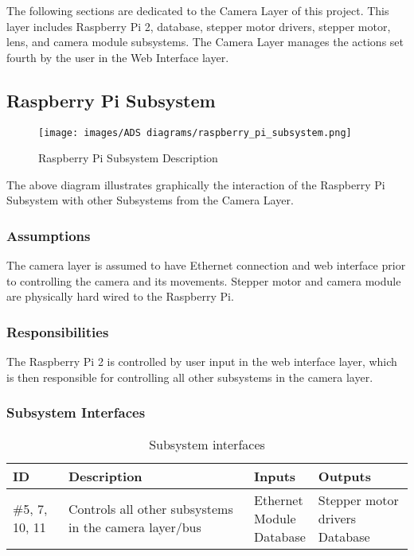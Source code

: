 The following sections are dedicated to the Camera Layer of this project. This layer includes Raspberry Pi 2, database, stepper motor drivers, stepper motor, lens, and camera module subsystems. The Camera Layer manages the actions set fourth by the user in the Web Interface layer.

\subsection{Raspberry Pi Subsystem}

\begin{figure}[h!]
	\centering
 	\texttt{[image: images/ADS diagrams/raspberry\_pi\_subsystem.png]}
 \caption{Raspberry Pi Subsystem Description}
\end{figure}

The above diagram illustrates graphically the interaction of the Raspberry Pi Subsystem with other Subsystems from the Camera Layer.

\subsubsection{Assumptions}
The camera layer is assumed to have Ethernet connection and web interface prior to controlling the camera and its movements. Stepper motor and camera module are physically hard wired to the Raspberry Pi. 

\subsubsection{Responsibilities}
The Raspberry Pi 2 is controlled by user input in the web interface layer, which is then responsible for controlling all other subsystems in the camera layer.

\subsubsection{Subsystem Interfaces}

\begin {table}[H]
\caption {Subsystem interfaces} 
\begin{center}
    \begin{tabular}{ | p{1cm} | p{6cm} | p{3cm} | p{3cm} |}
    \hline
    ID & Description & Inputs & Outputs \\ \hline
    \#5, 7, 10, 11 & Controls all other subsystems in the camera layer/bus & \pbox{3cm}{Ethernet \\ Module \\ Database } & \pbox{3cm}{Stepper motor drivers \\ Database}  \\ \hline
   
    
    \end{tabular}
\end{center}
\end{table}



